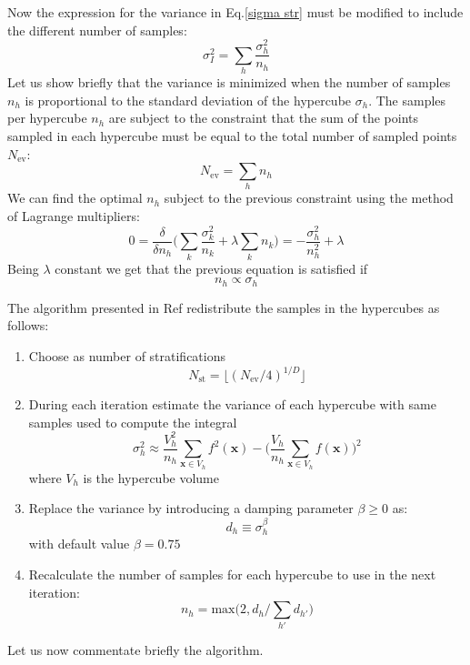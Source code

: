 \documentclass[../main/main.tex]{subfiles}
\begin{document}
Now the expression for the variance in Eq.\eqref{sigma str} must be modified to include the different number of samples:
\begin{equation}
		\sigma^2_I = \sum_h  \frac{\sigma^2_h}{n_h}
\end{equation}
Let us show briefly that the variance is minimized when the number of samples $n_h$ is proportional to the standard deviation of the hypercube 
$\sigma_h$.
The samples per hypercube $n_h$ are subject to the constraint that the sum of the points sampled in each hypercube  must be equal to the total number of sampled
points $N_\text{ev}$:
\begin{equation}
	N_\text{ev} = \sum_h n_h
\end{equation}
We can find the optimal $n_h$ subject to the previous constraint using the method of Lagrange multipliers:
\begin{equation}
	0 = \frac{\delta}{\delta n_h} \bigg( \sum_k \frac{\sigma^2_k}{n_k} + \lambda \sum_k n_k\bigg) =  - \frac{\sigma^2_h}{n^2_h} + \lambda
\end{equation}
Being $\lambda$ constant we get that the previous equation is satisfied if
\begin{equation}
	n_h \propto \sigma_h
\end{equation}

The algorithm presented in Ref\cite{Lepage:2020tgj} redistribute the samples in the hypercubes as follows:

\begin{enumerate}
	\item Choose as number of stratifications
	\begin{equation}
		\label{nstrat}
		N_\text{st} = \lfloor (N_\text{ev}/4)^{1/D}\rfloor 
	\end{equation}
\item 
During each iteration estimate the variance of each hypercube with same samples used to compute the integral
\begin{equation}
	\sigma^2_h \approx \frac{V_h^2}{n_h} \sum_{\textbf{x} \in V_h} f^2(\textbf{x}) - \bigg( \frac{V_h}{n_h} \sum_{\textbf{x} \in V_h} f(\textbf{x})\bigg)^2
\end{equation}
where $V_h$ is the hypercube volume
\item Replace the variance by introducing a damping parameter $\beta \ge 0$ as:
\begin{equation}
	d_h \equiv \sigma_h^\beta
\end{equation}
with default value $\beta = 0.75$
\item 
Recalculate the number of samples for each hypercube to use in the next iteration:
\begin{equation}
	n_h = \text{max} \big(2, d_h / \sum_{h'} d_{h'}\big)
\end{equation}
\end{enumerate}
Let us now commentate briefly the algorithm.
\end{document}
